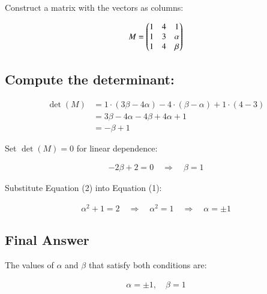 \documentclass{article}
\begin{document}
Construct a matrix with the vectors as columns:


\begin{align}
M = \begin{pmatrix}
1 & 4 & 1 \\
1 & 3 & \alpha \\
1 & 4 & \beta
\end{pmatrix}
\end{align}



\subsection*{Compute the determinant:}
\begin{align*}
\det(M) &= 1 \cdot (3\beta - 4\alpha) - 4 \cdot (\beta - \alpha) + 1 \cdot (4 - 3) \\
&= 3\beta - 4\alpha - 4\beta + 4\alpha + 1 \\
&= -\beta + 1
\end{align*}

Set $\det(M) = 0$ for linear dependence:


\begin{align}
-2\beta + 2 = 0 \quad \Rightarrow \quad \beta = 1 \tag{2}
\end{align}



Substitute Equation (2) into Equation (1):


\begin{align}
\alpha^2 + 1 = 2 \quad \Rightarrow \quad \alpha^2 = 1 \quad \Rightarrow \quad \alpha = \pm1
\end{align}



\subsection*{Final Answer}
The values of $\alpha$ and $\beta$ that satisfy both conditions are:


\begin{align}
\boxed{\alpha = \pm1, \quad \beta = 1}
\end{align}
\end{document}
